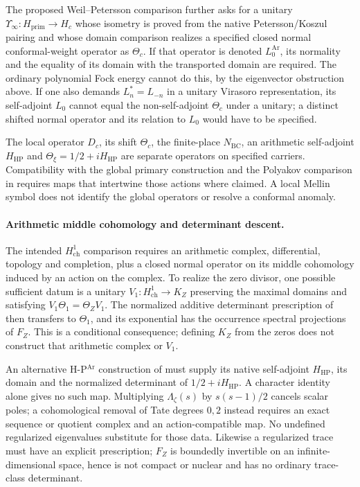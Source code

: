 The proposed Weil--Petersson comparison further asks for a unitary
$\Upsilon_\infty:H_{\mathrm{prim}}\to H_c$ whose isometry is proved
from the native Petersson/Koszul pairing and whose domain comparison
realizes a specified closed normal conformal-weight operator as
$\Theta_c$. If that operator is denoted $L_0^{\mathrm{Ar}}$, its
normality and the equality of its domain with the transported domain
are required. The ordinary polynomial Fock energy cannot do this,
by the eigenvector obstruction above. If one also demands
$L_n^*=L_{-n}$ in a unitary Virasoro representation, its self-adjoint
$L_0$ cannot equal the non-self-adjoint $\Theta_c$ under a unitary;
a distinct shifted normal operator and its relation to $L_0$ would
have to be specified.

The local operator $D_c$, its shift $\Theta_c$, the finite-place
$N_{\mathrm{BC}}$, an arithmetic self-adjoint $H_{\mathrm{HP}}$ and
$\Theta_\xi=1/2+iH_{\mathrm{HP}}$ are separate operators on specified
carriers. Compatibility with the global primary construction and
the Polyakov comparison in
 requires maps that
intertwine those actions where claimed. A local Mellin symbol does
not identify the global operators or resolve a conformal anomaly.

\paragraph{Arithmetic middle cohomology and determinant descent.}
\label{v4-arith:pres90:cohomology}
The intended $H^1_{\mathrm{ch}}$ comparison requires an arithmetic
complex, differential, topology and completion, plus a closed normal
operator on its middle cohomology induced by an action on the complex.
To realize the zero divisor, one possible sufficient datum is a
unitary $V_1:H^1_{\mathrm{ch}}\to K_Z$ preserving the maximal domains
and satisfying $V_1\Theta_1=\Theta_ZV_1$. The normalized additive
determinant prescription of  then
transfers to $\Theta_1$, and its exponential has the occurrence
spectral projections of $F_Z$. This is a conditional consequence;
defining $K_Z$ from the zeros does not construct that arithmetic
complex or $V_1$.

An alternative H-P\(^{\mathrm{Ar}}\) construction of
 must supply its native self-adjoint
$H_{\mathrm{HP}}$, its domain and the normalized determinant of
$1/2+iH_{\mathrm{HP}}$. A character identity alone gives no such map.
Multiplying $\Lambda_\zeta(s)$ by $s(s-1)/2$ cancels scalar poles;
a cohomological removal of Tate degrees $0,2$ instead requires
an exact sequence or quotient complex and an action-compatible
map. No undefined regularized eigenvalues substitute for those data.
Likewise a regularized trace must have an explicit prescription;
$F_Z$ is boundedly invertible on an infinite-dimensional space,
hence is not compact or nuclear and has no ordinary trace-class determinant.

